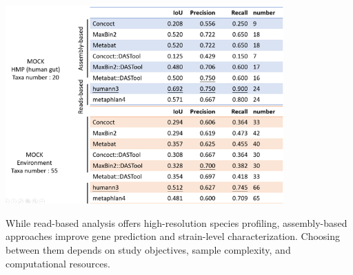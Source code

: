 \documentclass[
]{article}
\begin{document}
\includegraphics[width=0.8\textwidth,height=\textheight]{images/Fig18.png}

While read-based analysis offers high-resolution species profiling,
assembly-based approaches improve gene prediction and strain-level
characterization. Choosing between them depends on study objectives,
sample complexity, and computational resources.
\end{document}
